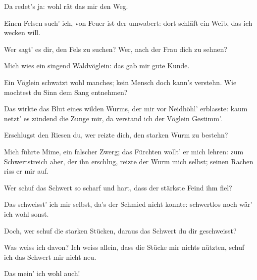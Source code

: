 \begin{drama}

Da redet's ja:
wohl rät das mir den Weg.


Einen Felsen such' ich,
von Feuer ist der umwabert:
dort schläft ein Weib,
das ich wecken will.

\Wandererspeaks

Wer sagt' es dir,
den Fels zu suchen?
Wer, nach der Frau dich zu sehnen?

\Siegfriedspeaks

Mich wies ein singend
Waldvöglein:
das gab mir gute Kunde.

\Wandererspeaks

Ein Vöglein schwatzt wohl manches;
kein Mensch doch kann's verstehn.
Wie mochtest du Sinn
dem Sang entnehmen?

\Siegfriedspeaks

Das wirkte das Blut
eines wilden Wurms,
der mir vor Neidhöhl' erblasste:
kaum netzt' es zündend
die Zunge mir,
da verstand ich der Vöglein Gestimm'.

\Wandererspeaks

Erschlugst den Riesen du,
wer reizte dich,
den starken Wurm zu bestehn?

\Siegfriedspeaks

Mich führte Mime,
ein falscher Zwerg;
das Fürchten wollt' er mich lehren:
zum Schwertstreich aber,
der ihn erschlug,
reizte der Wurm mich selbst;
seinen Rachen riss er mir auf.

\Wandererspeaks

Wer schuf das Schwert
so scharf und hart,
dass der stärkste Feind ihm fiel?

\Siegfriedspeaks

Das schweisst' ich mir selbst,
da's der Schmied nicht konnte:
schwertlos noch wär' ich wohl sonst.

\Wandererspeaks

Doch, wer schuf
die starken Stücken,
daraus das Schwert du dir geschweisst?

\Siegfriedspeaks

Was weiss ich davon?
Ich weiss allein,
dass die Stücke mir nichts nützten,
schuf ich das Schwert mir nicht neu.

\Wandererspeaks


Das mein' ich wohl auch!



\end{drama}
